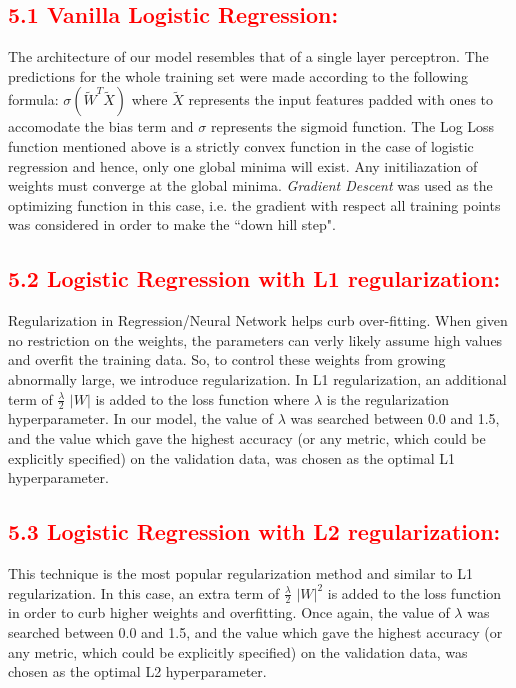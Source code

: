 \documentclass[a4paper,10pt,twoside]{article}
\begin{document}
\subsection*{\textcolor{red}{5.1 Vanilla Logistic Regression:}}
The architecture of our model resembles that of a single layer perceptron. The predictions for the whole training set were made according to the following formula: $\sigma(\widetilde{W}^T \widetilde{X})$ where $\widetilde{X}$ represents the input features padded with ones to accomodate the bias term and $\sigma$ represents the sigmoid function. The Log Loss function mentioned above is a strictly convex function in the case of logistic regression and hence, only one global minima will exist. Any initiliazation of weights must converge at the global minima. \textit{Gradient Descent} was used as the optimizing function in this case, i.e. the gradient with respect all training points was considered in order to make the ``down hill step".

\subsection*{\textcolor{red}{5.2 Logistic Regression with L1 regularization:}}
Regularization in Regression/Neural Network helps curb over-fitting. When given no restriction on the weights, the parameters can verly likely assume high values and overfit the training data. So, to control these weights from growing abnormally large, we introduce regularization. In L1 regularization, an additional term of $\frac{\lambda}{2}$ $|W|$ is added to the loss function where $\lambda$ is the regularization hyperparameter. In our model, the value of $\lambda$ was searched between 0.0 and 1.5, and the value which gave the highest accuracy (or any metric, which could be explicitly specified) on the validation data, was chosen as the optimal L1 hyperparameter.

\subsection*{\textcolor{red}{5.3 Logistic Regression with L2 regularization:}}
This technique is the most popular regularization method and similar to L1 regularization. In this case, an extra term of $\frac{\lambda}{2}$ $|W|^2$ is added to the loss function in order to curb higher weights and overfitting. Once again, the value of $\lambda$ was searched between 0.0 and 1.5, and the value which gave the highest accuracy (or any metric, which could be explicitly specified) on the validation data, was chosen as the optimal L2 hyperparameter.
\end{document}
